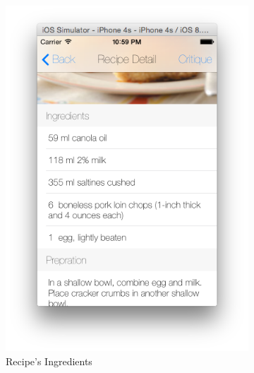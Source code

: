 \begin{figure}[h]
\begin{subfigure}{.32\textwidth}
	  		\includegraphics[width=.9\linewidth]{figures/ch4_app_screen_shots/recipe_detail/recipe_detail_2.png}
	  		\caption{Recipe's Ingredients}
	  	\end{subfigure}
	  	\begin{subfigure}{.32\textwidth}

\end{subfigure}
\end{figure}
